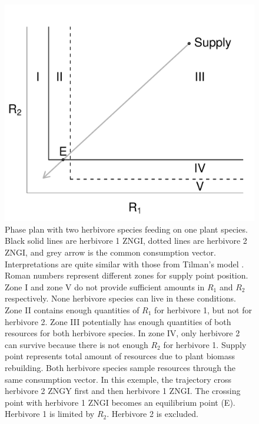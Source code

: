 \documentclass[12pt]{article}
\begin{document}
\begin{figure}[h]
\centering
\includegraphics[width=14cm,keepaspectratio]{1plant} 
\caption{Phase plan with two herbivore species feeding on one plant species. Black solid lines are herbivore 1 ZNGI, dotted lines are herbivore 2 ZNGI, and grey arrow is the common consumption vector. Interpretations are quite similar with those from Tilman's model \citep{Tilman1982}. Roman numbers represent different zones for supply point position. Zone I and zone V do not provide sufficient amounts in $R_1$ and $R_2$ respectively. None herbivore species can live in these conditions. Zone II contains enough quantities of $R_1$ for herbivore 1, but not for herbivore 2. Zone III potentially has enough quantities of both resources for both herbivore species. In zone IV, only herbivore 2 can survive because there is not enough $R_2$ for herbivore 1. Supply point represents total amount of resources due to plant biomass rebuilding. Both herbivore species sample resources through the same consumption vector. In this exemple, the trajectory cross herbivore 2 ZNGY first and then herbivore 1 ZNGI. The crossing point with herbivore 1 ZNGI becomes an equilibrium point (E). Herbivore 1 is limited by $R_2$. Herbivore 2 is excluded.}
\label{herbifig}
\end{figure}
\end{document}
